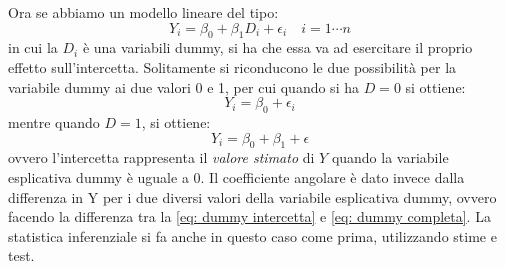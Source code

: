 Ora se abbiamo un modello lineare del tipo:
\begin{equation}
Y_i = \beta_0 + \beta_1 D_i + \epsilon_i \quad i=1 \cdots n
\end{equation}
in cui la $D_i$ è una variabili dummy, si ha che essa va ad esercitare il proprio effetto sull'intercetta. Solitamente si riconducono le due possibilità per la variabile dummy ai due valori 0 e 1, per cui quando si ha $D=0$ si ottiene:
\begin{equation}
Y_i = \beta_0 + \epsilon_i
\label{eq: dummy intercetta}
\end{equation}
mentre quando $D=1$, si ottiene:
\begin{equation}
Y_i = \beta_0 + \beta_1 + \epsilon
\label{eq: dummy completa}
\end{equation}
ovvero l'intercetta rappresenta il \textit{valore stimato} di $Y$ quando la variabile esplicativa dummy è uguale a 0. Il coefficiente angolare è dato invece dalla differenza in Y per i due diversi valori della variabile esplicativa dummy, ovvero facendo la differenza tra la \eqref{eq: dummy intercetta} e \eqref{eq: dummy completa}.
La statistica inferenziale si fa anche in questo caso come prima, utilizzando stime e test.

